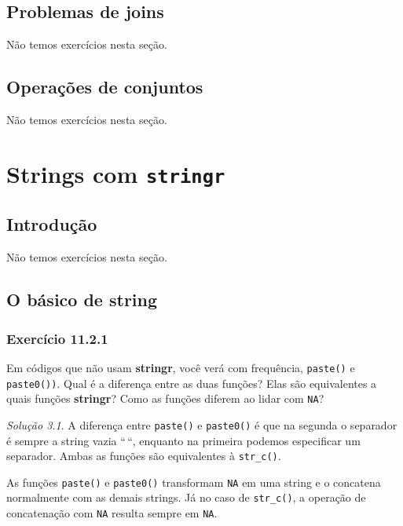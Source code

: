 \documentclass[
]{latex/krantz}
\theoremstyle{definition}
\theoremstyle{definition}
\theoremstyle{definition}
\theoremstyle{definition}
\theoremstyle{remark}
\newtheorem*{solution}{Solução}
\begin{document}
\hypertarget{problemas-de-joins}{%
\section{Problemas de joins}\label{problemas-de-joins}}

Não temos exercícios nesta seção.

\hypertarget{operauxe7uxf5es-de-conjuntos}{%
\section{Operações de conjuntos}\label{operauxe7uxf5es-de-conjuntos}}

Não temos exercícios nesta seção.

\hypertarget{strings-com-stringr}{%
\chapter{\texorpdfstring{Strings com \texttt{stringr}}{Strings com stringr}}\label{strings-com-stringr}}

\hypertarget{introduuxe7uxe3o-7}{%
\section{Introdução}\label{introduuxe7uxe3o-7}}

Não temos exercícios nesta seção.

\hypertarget{o-buxe1sico-de-string}{%
\section{O básico de string}\label{o-buxe1sico-de-string}}

\hypertarget{exr11-2-1}{%
\subsection*{Exercício 11.2.1}\label{exr11-2-1}}

Em códigos que não usam \textbf{stringr}, você verá com frequência, \texttt{paste()} e \texttt{paste0())}. Qual é a diferença entre as duas funções? Elas são equivalentes a quais funções \textbf{stringr}? Como as funções diferem ao lidar com \texttt{NA}?

\begin{solution}
A diferença entre \texttt{paste()} e \texttt{paste0()} é que na segunda o separador é sempre a string vazia ``\,``, enquanto na primeira podemos especificar um separador. Ambas as funções são equivalentes à \texttt{str\_c()}.

As funções \texttt{paste()} e \texttt{paste0()} transformam \texttt{NA} em uma string e o concatena normalmente com as demais strings. Já no caso de \texttt{str\_c()}, a operação de concatenação com \texttt{NA} resulta sempre em \texttt{NA}.
\end{solution}
\end{document}
